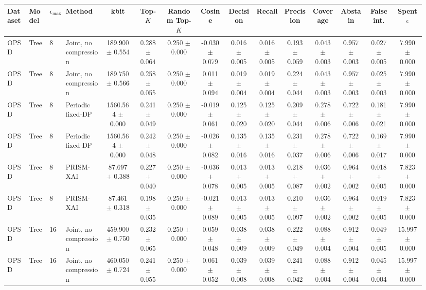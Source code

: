 \begin{tabular}{llllccccccccccc}
\toprule
Dataset & Model & $\epsilon_{\max}$ & Method & kbit & Top-$K$ & Random Top-$K$ & Cosine & Decision & Recall & Precision & Coverage & Abstain & False int. & Spent $\epsilon$ \\
\midrule
OPSD & Tree & 8 & Joint, no compression & 189.900 $\pm$ 0.554 & 0.288 $\pm$ 0.064 & 0.250 $\pm$ 0.000 & -0.030 $\pm$ 0.079 & 0.016 $\pm$ 0.005 & 0.016 $\pm$ 0.005 & 0.193 $\pm$ 0.059 & 0.043 $\pm$ 0.003 & 0.957 $\pm$ 0.003 & 0.027 $\pm$ 0.005 & 7.990 $\pm$ 0.000 \\
OPSD & Tree & 8 & Joint, no compression & 189.750 $\pm$ 0.566 & 0.258 $\pm$ 0.055 & 0.250 $\pm$ 0.000 & 0.011 $\pm$ 0.094 & 0.019 $\pm$ 0.004 & 0.019 $\pm$ 0.004 & 0.224 $\pm$ 0.044 & 0.043 $\pm$ 0.003 & 0.957 $\pm$ 0.003 & 0.025 $\pm$ 0.003 & 7.990 $\pm$ 0.000 \\
OPSD & Tree & 8 & Periodic fixed-DP & 1560.564 $\pm$ 0.000 & 0.241 $\pm$ 0.049 & 0.250 $\pm$ 0.000 & -0.019 $\pm$ 0.061 & 0.125 $\pm$ 0.020 & 0.125 $\pm$ 0.020 & 0.209 $\pm$ 0.044 & 0.278 $\pm$ 0.006 & 0.722 $\pm$ 0.006 & 0.181 $\pm$ 0.021 & 7.990 $\pm$ 0.000 \\
OPSD & Tree & 8 & Periodic fixed-DP & 1560.564 $\pm$ 0.000 & 0.242 $\pm$ 0.048 & 0.250 $\pm$ 0.000 & -0.026 $\pm$ 0.082 & 0.135 $\pm$ 0.016 & 0.135 $\pm$ 0.016 & 0.231 $\pm$ 0.037 & 0.278 $\pm$ 0.006 & 0.722 $\pm$ 0.006 & 0.169 $\pm$ 0.017 & 7.990 $\pm$ 0.000 \\
OPSD & Tree & 8 & PRISM-XAI & 87.697 $\pm$ 0.388 & 0.227 $\pm$ 0.040 & 0.250 $\pm$ 0.000 & -0.036 $\pm$ 0.078 & 0.013 $\pm$ 0.005 & 0.013 $\pm$ 0.005 & 0.218 $\pm$ 0.087 & 0.036 $\pm$ 0.002 & 0.964 $\pm$ 0.002 & 0.018 $\pm$ 0.005 & 7.823 $\pm$ 0.000 \\
OPSD & Tree & 8 & PRISM-XAI & 87.461 $\pm$ 0.318 & 0.198 $\pm$ 0.035 & 0.250 $\pm$ 0.000 & -0.021 $\pm$ 0.089 & 0.013 $\pm$ 0.005 & 0.013 $\pm$ 0.005 & 0.210 $\pm$ 0.097 & 0.036 $\pm$ 0.002 & 0.964 $\pm$ 0.002 & 0.019 $\pm$ 0.005 & 7.823 $\pm$ 0.000 \\
OPSD & Tree & 16 & Joint, no compression & 459.900 $\pm$ 0.750 & 0.232 $\pm$ 0.065 & 0.250 $\pm$ 0.000 & 0.059 $\pm$ 0.048 & 0.038 $\pm$ 0.009 & 0.038 $\pm$ 0.009 & 0.222 $\pm$ 0.049 & 0.088 $\pm$ 0.004 & 0.912 $\pm$ 0.004 & 0.049 $\pm$ 0.005 & 15.997 $\pm$ 0.000 \\
OPSD & Tree & 16 & Joint, no compression & 460.050 $\pm$ 0.724 & 0.241 $\pm$ 0.055 & 0.250 $\pm$ 0.000 & 0.061 $\pm$ 0.052 & 0.039 $\pm$ 0.008 & 0.039 $\pm$ 0.008 & 0.241 $\pm$ 0.042 & 0.088 $\pm$ 0.004 & 0.912 $\pm$ 0.004 & 0.045 $\pm$ 0.004 & 15.997 $\pm$ 0.000 \\

\end{tabular}
